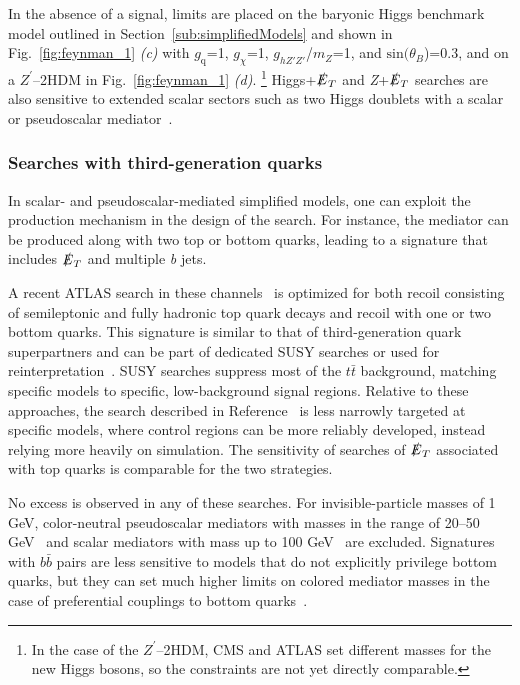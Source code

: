 \documentclass{ar-1col}
\newcommand{\chiDM}{\ensuremath{\chi}\xspace}
\newcommand{\gDM}{\ensuremath{g_{\chiDM}}\xspace}
\newcommand{\gdm}{\gDM}
\newcommand{\gq}{$g_{\mathrm{q}}$\xspace}
\newcommand{\ghZprimeZprime}{\ensuremath{g_{hZ'Z'}}\xspace}
\newcommand{\sinthetab}{\ensuremath{\mathrm{sin}(\theta_B})\xspace}
\newcommand{\MET}{\ensuremath{\slashed{E}_T}\xspace}
\newcommand{\Zprime}{\ensuremath{{Z}^\prime}\xspace}
\begin{document}
In the absence of a signal, limits are placed on the baryonic Higgs benchmark
model outlined in Section~\ref{sub:simplifiedModels} and shown in Fig.~\ref{fig:feynman_1} \textit{(c)}
with \gq=1, \gdm=1, \ghZprimeZprime/$m_{Z}$=1, and \sinthetab=0.3, and on a
\Zprime--2HDM in Fig.~\ref{fig:feynman_1} \textit{(d)}.
\footnote{In the case of the \Zprime--2HDM, CMS and ATLAS set different masses for the new Higgs
bosons, so the constraints are not yet directly comparable.} 
Higgs+\MET and \textit{Z}+\MET searches are also sensitive to extended
scalar sectors such as two Higgs doublets with a scalar or
pseudoscalar mediator~\cite{Bauer:2017ota,Goncalves:2016iyg,Bell:2016ekl}.

\subsubsection{Searches with third-generation quarks}

In scalar- and pseudoscalar-mediated simplified models, one can
exploit the production mechanism in the design of the search. For
instance, the mediator can be produced along with two top or
bottom quarks, leading to a signature that includes \MET and multiple \textit{b} jets.

A recent ATLAS search in these channels~\cite{Aaboud:2017rzf} is
optimized for both recoil consisting of semileptonic and fully
hadronic top quark decays and recoil with one or two bottom
quarks. This signature is similar to that of third-generation
quark superpartners and can be part of dedicated SUSY searches or
used for reinterpretation~\cite{Aaboud:2017aeu,Sirunyan:2017leh}.
SUSY searches suppress most of the $t\bar{t}$ background, matching
specific models to specific, low-background signal regions.
Relative to these approaches, the search described in
Reference~ is less narrowly targeted at specific
models, where control regions can be more reliably developed,
instead relying more heavily on simulation. The sensitivity of
searches of \MET associated with top quarks is comparable for the
two strategies.

No excess is observed in any of these searches. For invisible-particle masses of
1 GeV, color-neutral pseudoscalar mediators with masses in the range of 20--50
GeV~\cite{Aaboud:2017aeu} and scalar mediators with mass up to 100
GeV~\cite{Sirunyan:2017leh} are excluded. Signatures with
$b\bar{b}$ pairs are less sensitive to models that do not
explicitly privilege bottom quarks, but they can set much higher limits
on colored mediator masses in the case of preferential couplings to
bottom quarks~\cite{Agrawal:2014una}.
\end{document}
